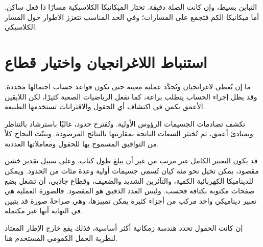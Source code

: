 التباين بسيط، وإن كانت الصلة دقيقة. تختار الميكانيكا الكلاسيكية مسارًا ذا فعل ساكن. أما ميكانيكا الكم فتجمع على المسارات؛ وفي الحد المناسب تتعزز الأطوار حول المسار الكلاسيكي.

\section{استنباط اللاغرانجيان واختيار قطاع}

ما إن يُعطى لاغرانجيان وتُحدَّد عملية معينة حتى تكون قواعد حساب احتمالها محددة. وقد يظل إجراء الحساب يتطلب براعة، كما تفعل الرياضيات الصعبة كثيرًا، لكن اللايقين الأعمق يكمن في اكتشاف أي الحقول والاقترانات تستخدمها الطبيعة.

\begin{classroomqa}
\end{classroomqa}

تكشف تصادمات الجسيمات الرؤوس الأولية. وتُقترح حدود، غالبًا باسترشاد بالتناظر وبمبادئ أعمق، ثم تُختبَر السعات الناتجة بمقارنتها بالنتائج المرصودة. ويثبّت النجاح كلاً من التوافيق المسموح بها للحقول ومعاملاتها العددية.

\begin{classroomqa}
\end{classroomqa}

قد يكون التعبير الكامل غير مرتب من غير أن يبلغ طول كتاب. وعلى سبيل تقدير خشن مقصود، يمكن تخيل نحو مئة كيان تُسمى جسيمات أولية وعدة مئات من الحدود. ويمكن للديناميكا الكهربائية الكمية، والتآثرين الشديد والضعيف، وقطاع جاذبي، أن تشغل بضع صفحات مكتوبة بكثافة فحسب. وليس العدد الدقيق هو المقصود. فالصورة العملية هي تعبير ديناميكي واحد مركب من أجزاء كثيرة يمكن تمييزها، وهي صراحةً صورة قد يتبين في النهاية أنها غير مكتملة.

إن كانت الحقول تحدد هندسة زمكانية أكثر أساسية، فذلك يقع خارج الإطار المعتاد لنظرية الحقل الكمومي المستخدم هنا.

